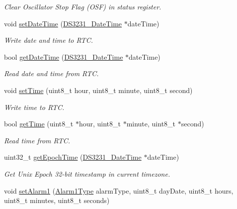\begin{DoxyCompactItemize}
\begin{DoxyCompactList}\small\item\em Clear Oscillator Stop Flag (O\+SF) in status register. \end{DoxyCompactList}\item 
void \hyperlink{class_d_s3231_aef50339f978d9fbe4cdd42e38c26fc0c}{set\+Date\+Time} (\hyperlink{_erriez_d_s3231_8h_a79a5c1f4b249b6f512ca108013374536}{D\+S3231\+\_\+\+Date\+Time} $\ast$date\+Time)
\begin{DoxyCompactList}\small\item\em Write date and time to R\+TC. \end{DoxyCompactList}\item 
bool \hyperlink{class_d_s3231_a5c627e2a9a7b7c9c99723b6c0916889f}{get\+Date\+Time} (\hyperlink{_erriez_d_s3231_8h_a79a5c1f4b249b6f512ca108013374536}{D\+S3231\+\_\+\+Date\+Time} $\ast$date\+Time)
\begin{DoxyCompactList}\small\item\em Read date and time from R\+TC. \end{DoxyCompactList}\item 
void \hyperlink{class_d_s3231_a03ff0537cadf522c98801d42fe55bb08}{set\+Time} (uint8\+\_\+t hour, uint8\+\_\+t minute, uint8\+\_\+t second)
\begin{DoxyCompactList}\small\item\em Write time to R\+TC. \end{DoxyCompactList}\item 
bool \hyperlink{class_d_s3231_ac4b80a2bcda996f2629b2197688d79bc}{get\+Time} (uint8\+\_\+t $\ast$hour, uint8\+\_\+t $\ast$minute, uint8\+\_\+t $\ast$second)
\begin{DoxyCompactList}\small\item\em Read time from R\+TC. \end{DoxyCompactList}\item 
uint32\+\_\+t \hyperlink{class_d_s3231_af0e5a643bf64755c12e40f8cf293035b}{get\+Epoch\+Time} (\hyperlink{_erriez_d_s3231_8h_a79a5c1f4b249b6f512ca108013374536}{D\+S3231\+\_\+\+Date\+Time} $\ast$date\+Time)
\begin{DoxyCompactList}\small\item\em Get Unix Epoch 32-\/bit timestamp in current timezone. \end{DoxyCompactList}\item 
void \hyperlink{class_d_s3231_a3386f9c527b7e94ef20338af45b9ba24}{set\+Alarm1} (\hyperlink{_erriez_d_s3231_8h_aa29471da8f6d22930cc9159a55a49273}{Alarm1\+Type} alarm\+Type, uint8\+\_\+t day\+Date, uint8\+\_\+t hours, uint8\+\_\+t minutes, uint8\+\_\+t seconds)

\end{DoxyCompactItemize}
